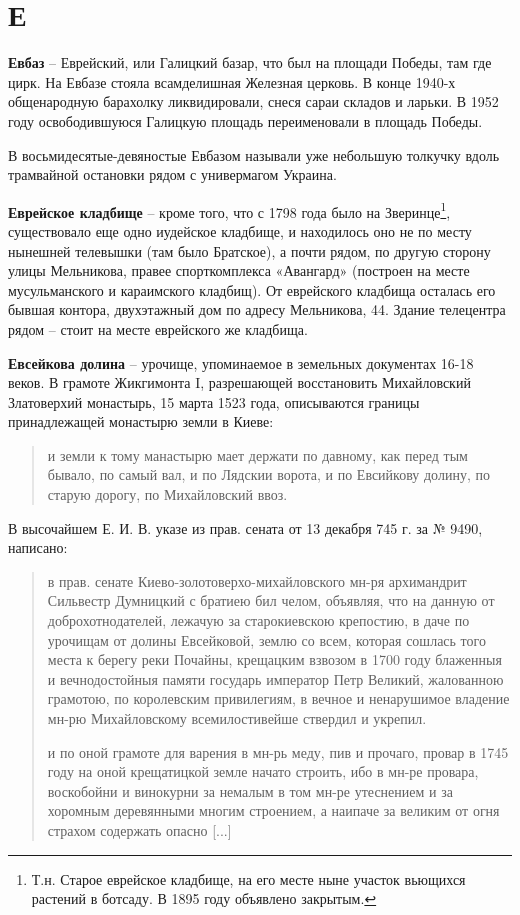\chapter*{Е}

\textbf{Евбаз} – Еврейский, или Галицкий базар, что был на площади Победы, там где цирк. На Евбазе стояла всамделишная Железная церковь. В конце 1940-х общенародную барахолку ликвидировали, снеся сараи складов и ларьки. В 1952 году освободившуюся Галицкую площадь переименовали в площадь Победы.

В восьмидесятые-девяностые Евбазом называли уже небольшую толкучку вдоль трамвайной остановки рядом с универмагом Украина.\\

\medskip

\textbf{Еврейское кладбище} – кроме того, что с 1798 года было на Зверинце\footnote{Т.н. Старое еврейское кладбище, на его месте ныне участок вьющихся растений в ботсаду. В 1895 году объявлено закрытым.}, существовало еще одно иудейское кладбище, и находилось оно не по месту нынешней телевышки (там было Братское), а почти рядом, по другую сторону улицы Мельникова, правее спорткомплекса «Авангард» (построен на месте мусульманского и караимского кладбищ). От еврейского кладбища осталась его бывшая контора, двухэтажный дом по адресу Мельникова, 44. Здание телецентра рядом – стоит на месте еврейского же кладбища.\\

\medskip

\textbf{Евсейкова долина} – урочище, упоминаемое в земельных документах 16-18 веков. В грамоте Жикгимонта I, разрешающей восстановить Михайловский Златоверхий монастырь, 15 марта 1523 года, описываются границы принадлежащей монастырю земли в Киеве:

\begin{quotation}
и земли к тому манастырю мает держати по давному, как перед тым бывало, по самый вал, и по Лядскии ворота, и по Евсийкову долину, по старую дорогу, по Михайловский ввоз.
\end{quotation}

В высочайшем Е. И. В. указе из прав. сената от 13 декабря 745 г. за № 9490, написано: 

\begin{quotation}
в прав. сенате Киево-золотоверхо-михайловского мн-ря архимандрит Си\-львестр Думницкий с братиею бил челом, объявляя, что на данную от доброхотнодателей, лежачую за старокиевскою крепостию, в даче по урочищам от долины Евсейковой, землю со всем, которая сошлась того места к берегу реки Почайны, крещацким взвозом в 1700 году блаженныя и вечнодостойныя памяти государь император Петр Великий, жалованною грамотою, по королевским привилегиям, в вечное и ненарушимое владение мн-рю Михайловскому всемилостивейше ствердил и укрепил. 

и по оной грамоте для варения в мн-рь меду, пив и прочаго, провар в 1745 году на оной крещатицкой земле начато строить, ибо в мн-ре провара, воскобойни и винокурни за немалым в том мн-ре утеснением и за хоромным деревянными многим строением, а наипаче за великим от огня страхом содержать опасно [...]
\end{quotation}


